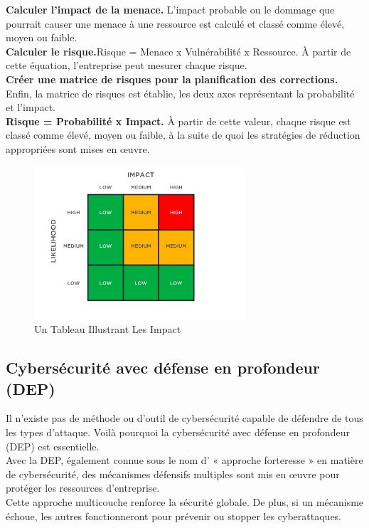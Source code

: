  \textbf{Calculer l’impact de la menace.} L’impact probable ou le dommage que pourrait causer une menace à une ressource est calculé et classé comme élevé, moyen ou faible.\\
 \textbf{Calculer le risque.}Risque = Menace x Vulnérabilité x Ressource. À partir de cette équation, l’entreprise peut mesurer chaque risque.\\
\textbf{ Créer une matrice de risques pour la planification des corrections.} Enfin, la matrice de risques est établie, les deux axes représentant la probabilité et l’impact.\\

\textbf{Risque = Probabilité x Impact.} À partir de cette valeur, chaque risque est classé comme élevé, moyen ou faible, à la suite de quoi les stratégies de réduction appropriées sont mises en œuvre.\\
	\begin{center}
\begin{figure}[h]
	\includegraphics[width=0.7\textwidth]{PhotoMemoire/tableauImpact.png}
\caption{Un Tableau Illustrant Les Impact }
\end{figure}
\end{center}
\subsection{Cybersécurité avec défense en profondeur (DEP)}
Il n’existe pas de méthode ou d’outil de cybersécurité capable de défendre de tous les types d’attaque. Voilà pourquoi la cybersécurité avec défense en profondeur (DEP) est essentielle.\\
 Avec la DEP, également connue sous le nom d’ « approche forteresse » en matière de cybersécurité, des mécanismes défensifs multiples sont mis en œuvre pour protéger les ressources d’entreprise.\\
  Cette approche multicouche renforce la sécurité globale. De plus, si un mécanisme échoue, les autres fonctionneront pour prévenir ou stopper les cyberattaques.\\

